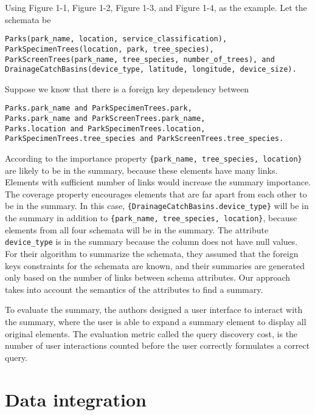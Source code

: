 Using Figure 1-1, Figure 1-2, Figure 1-3, and Figure 1-4, as the example. Let the schemata be
\begin{lstlisting}
Parks(park_name, location, service_classification),
ParkSpecimenTrees(location, park, tree_species),
ParkScreenTrees(park_name, tree_species, number_of_trees), and DrainageCatchBasins(device_type, latitude, longitude, device_size).
\end{lstlisting}

Suppose we know that there is a foreign key dependency between
\begin{lstlisting}
Parks.park_name and ParkSpecimenTrees.park,
Parks.park_name and ParkScreenTrees.park_name,
Parks.location and ParkSpecimenTrees.location,
ParkSpecimenTrees.tree_species and ParkScreenTrees.tree_species.
\end{lstlisting}

According to the importance property \verb+{park_name, tree_species, location}+ are likely to be in the summary, because these elements have many links. Elements with sufficient number of links would increase the summary importance. The coverage property encourages elements that are far apart from each other to be in the summary. In this case, \verb+{DrainageCatchBasins.device_type}+ will be in the summary in addition to \verb+{park_name, tree_species, location}+, because elements from all four schemata will be in the summary. The attribute \verb+device_type+ is in the summary because the column does not have null values. For their algorithm to summarize the schemata, they assumed that the foreign keys constraints for the schemata are known, and their summaries are generated only based on the number of links between schema attributes. Our approach takes into account the semantics of the attributes to find a summary.

To evaluate the summary, the authors designed a user interface to interact with the summary, where the user is able to expand a summary element to display all original elements. The evaluation metric called the query discovery cost, is the number of user interactions counted before the user correctly formulates a correct query.

\section{Data integration}
\label{sec:DataIntegration}

